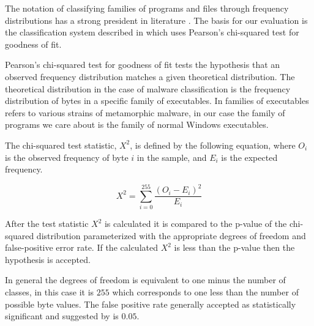 \documentclass[finalcopy,short]{srpaper}
\begin{document}
        The notation of classifying families of programs and files through
        frequency distributions has a strong president in literature
        \cite{chisquared,hmm_evade,stat_model,fileprints}. The basis for our
        evaluation is the classification system described in \cite{chisquared}
        which uses Pearson's chi-squared test for goodness of fit.

        Pearson's chi-squared test for goodness of fit tests the hypothesis that
        an observed frequency distribution matches a given theoretical
        distribution. The theoretical distribution in the case of malware
        classification is the frequency distribution of bytes in a specific
        family of executables. In \cite{chisquared} families of executables
        refers to various strains of metamorphic malware, in our case the family
        of programs we care about is the family of normal Windows executables.
        

        The chi-squared test statistic, $X^2$, is defined by the following
        equation, where $O_i$ is the observed frequency of byte $i$ in the
        sample, and $E_i$ is the expected frequency.

        $$X^2 = \sum_{i=0}^{255} \frac{(O_i - E_i)^2}{E_i}$$

        After the test statistic $X^2$ is calculated it is compared to the
        p-value of the chi-squared distribution parameterized with the
        appropriate degrees of freedom and false-positive error rate. If the
        calculated $X^2$ is less than the p-value then the hypothesis is
        accepted.

        In general the degrees of freedom is equivalent to one minus the number
        of classes, in this case it is $255$ which corresponds to one less than
        the number of possible byte values\cite{chisquared}. The false positive
        rate generally accepted as statistically significant and suggested by
        \cite{chisquared} is $0.05$.
\end{document}
